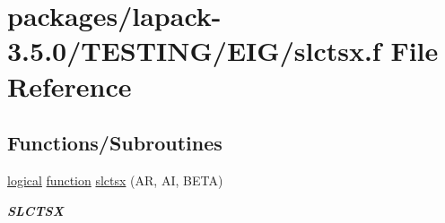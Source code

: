 \hypertarget{slctsx_8f}{}\section{packages/lapack-\/3.5.0/\+T\+E\+S\+T\+I\+N\+G/\+E\+I\+G/slctsx.f File Reference}
\label{slctsx_8f}
\subsection*{Functions/\+Subroutines}
\begin{DoxyCompactItemize}
\item 
\hyperlink{tnc_8c_aa7b64cdf39500931f7b333343791a104}{logical} \hyperlink{afunc_8m_a7b5e596df91eadea6c537c0825e894a7}{function} \hyperlink{group__single__eig_gabe65b08f429234a57b6b3253ec7da694}{slctsx} (A\+R, A\+I, B\+E\+T\+A)
\begin{DoxyCompactList}\small\item\em {\bfseries S\+L\+C\+T\+S\+X} \end{DoxyCompactList}\end{DoxyCompactItemize}
